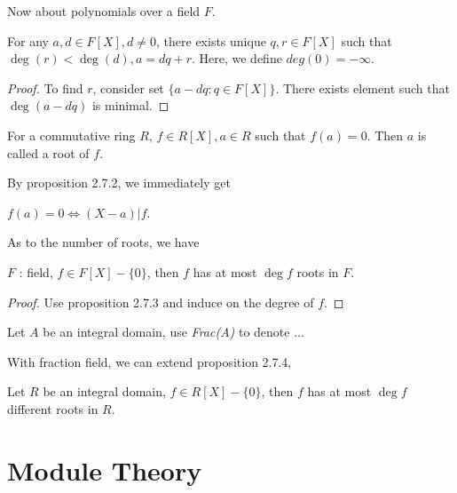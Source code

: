 \documentclass[11pt,fleqn]{book} %
\begin{document}
\begin{CJK}{UTF8}{gkai}
Now about polynomials over a field $F$.
\begin{proposition}
	[带余除法] For any $a,d \in F[X], d \neq 0$, there exists unique $q,r \in F[X]$ such that $\deg (r) <\deg (d), a = dq + r$. Here, we define $deg (0) = -\infty$.
\end{proposition}
\begin{proof}
	To find $r$, consider set $\{a - dq : q \in F[X]\}$. There exists element such that $\deg(a - dq)$ is minimal.	
\end{proof}

\begin{definition}
	[root] For a commutative ring $R$, $f \in R[X], a \in R$ such that $f(a) = 0$. Then $a$ is called a root of $f$.
\end{definition}

By proposition 2.7.2, we immediately get 
\begin{proposition}
	$f(a) = 0 \iff (X - a) | f$.
\end{proposition}

As to the number of roots, we have 
\begin{proposition}
	$F$ : field, $f \in F[X]-\{0\}$, then $f$ has at most $\deg f$ roots in $F$.
\end{proposition}
\begin{proof}
	Use proposition 2.7.3 and induce on the degree of $f$.
\end{proof}

\begin{definition}
	 Let $A$ be an integral domain, use {\it Frac(A)} to denote ... 
\end{definition}

With fraction field, we can extend proposition 2.7.4,
\begin{lemma}
	Let $R$ be an integral domain, $f \in R[X] - \{0\}$, then $f$ has at most $\deg f$ different roots in $R$.	
\end{lemma}

\chapter{Module Theory}

\end{CJK}
\end{document}
